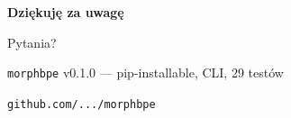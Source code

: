 \documentclass[aspectratio=169,11pt]{beamer}
\begin{document}
\begin{frame}[plain]
\begin{center}
\vspace{2cm}
{\color{slayerblue}\Huge\bfseries Dziękuję za uwagę\par}
\vspace{1cm}
{\large Pytania?\par}
\vspace{2cm}
{\small\texttt{morphbpe} v0.1.0 --- pip-installable, CLI, 29 testów\par}
{\small\texttt{github.com/.../morphbpe}\par}
\end{center}
\end{frame}
\end{document}
